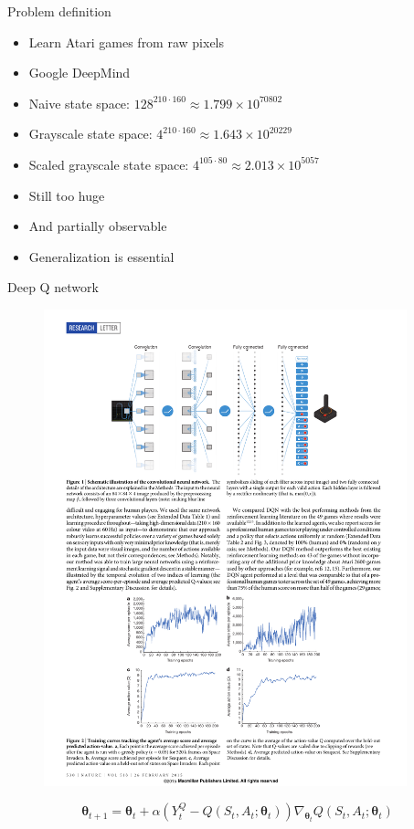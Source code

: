 \documentclass{beamer}
\begin{document}
\begin{frame}{Problem definition}
  \begin{itemize}
  \item {
    Learn Atari games from raw pixels
  }
  \item {
    Google DeepMind
  }
  \item {
      Naive state space: $128^{210 \cdot 160} \approx 1.799\times 10^{70802}$
  }
  \item {
      Grayscale state space: $4^{210 \cdot 160} \approx 1.643\times 10^{20229}$
  }
  \item {
      Scaled grayscale state space: $4^{105 \cdot 80} \approx 2.013\times 10^{5057}$
  }
  \item {
    Still too huge
  }
  \item {
    And partially observable
  }
  \item {
    Generalization is essential
  }
  \end{itemize}
\end{frame}

\begin{frame}{Deep Q network}
  \begin{figure}[H]
    \centering
    \includegraphics[width=105mm]{deep_q_network.pdf}
  \end{figure}
  \[ \boldsymbol{\theta}_{t+1} = \boldsymbol{\theta}_t+\alpha(Y_t^Q-Q(S_t,A_t;\boldsymbol{\theta}_t))\nabla_{\boldsymbol{\theta}_t}Q(S_t,A_t;\boldsymbol{\theta}_t) \]
\end{frame}
\end{document}
